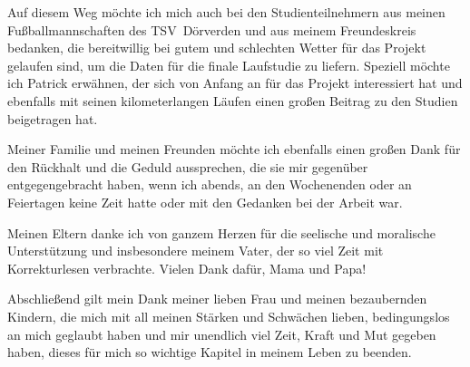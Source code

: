 Auf diesem Weg möchte ich mich auch bei den Studienteilnehmern aus meinen Fußballmannschaften des TSV~Dörverden und aus meinem Freundeskreis bedanken, die bereitwillig bei gutem und schlechten Wetter für das Projekt gelaufen sind, um die Daten für die finale Laufstudie zu liefern. Speziell möchte ich Patrick erwähnen, der sich von Anfang an für das Projekt interessiert hat und ebenfalls mit seinen kilometerlangen Läufen einen großen Beitrag zu den Studien beigetragen hat.

Meiner Familie und meinen Freunden möchte ich ebenfalls einen großen Dank für den Rückhalt und die Geduld aussprechen, die sie mir gegenüber entgegengebracht haben, wenn ich abends, an den Wochenenden oder an Feiertagen keine Zeit hatte oder mit den Gedanken bei der Arbeit war. 

Meinen Eltern danke ich von ganzem Herzen für die seelische und moralische Unterstützung und insbesondere meinem Vater, der so viel Zeit mit Korrekturlesen verbrachte. Vielen Dank dafür, Mama und Papa! 

Abschließend gilt mein Dank meiner lieben Frau und meinen bezaubernden Kindern, die mich mit all meinen Stärken und Schwächen lieben, bedingungslos an mich geglaubt haben und mir unendlich viel Zeit, Kraft und Mut gegeben haben, dieses für mich so wichtige Kapitel in meinem Leben zu beenden. 